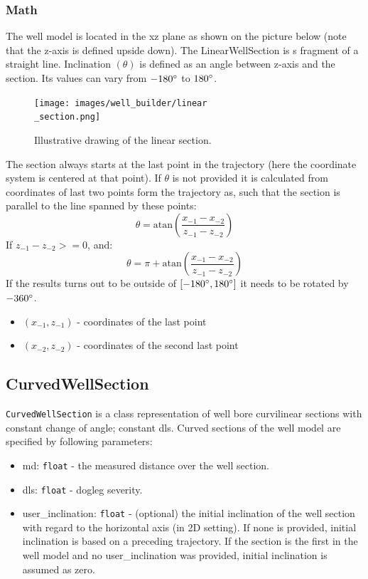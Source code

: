 	\subsubsection{Math}
	The well model is located in the xz plane as shown on the picture below (note that the z-axis is defined upside down). The LinearWellSection is s fragment of a straight line. Inclination $(\theta)$ is defined as an angle between z-axis and the section. Its values can vary from $-180\degree$ to $180\degree$.
	\begin{figure}[H]
		\centering
		\texttt{[image: images/well\_builder/linear\\\_section.png]}
		\caption{Illustrative drawing of the linear section.}
		\label{linear_section}
	\end{figure}
	The section always starts at the last point in the trajectory (here the coordinate system is centered at that point). If $\theta$ is not provided it is calculated from coordinates of last two points form the trajectory as, such that the section is parallel to the line spanned by these points:
	\begin{equation}
		\theta = \mathrm{atan}\left(\frac{x_{-1} - x_{-2}}{z_{-1} - z_{-2}}\right)
	\end{equation}
	If $z_{-1} - z_{-2} >= 0$, and:
	\begin{equation}
		\theta = \pi + \mathrm{atan}\left(\frac{x_{-1} - x_{-2}}{z_{-1} - z_{-2}}\right)
	\end{equation}
	If the results turns out to be outside of $[-180\degree, 180\degree]$ it needs to be rotated by $-360\degree$.
	\begin{itemize}
		\item $(x_{-1}, z_{-1})$ - coordinates of the last point
		\item $(x_{-2}, z_{-2})$ - coordinates of the second last point
	\end{itemize}
	\subsection{CurvedWellSection}
	\texttt{CurvedWellSection} is a class representation of well bore curvilinear sections with constant change of angle; constant dls. Curved sections of the well model are specified by following parameters:
	\begin{itemize}
		\item  \colorbox{gray!20}{md:} \texttt{float} - the measured distance over the well section.
		\item  \colorbox{gray!20}{dls:} \texttt{float} - dogleg severity.
		\item  \colorbox{gray!20}{user\_inclination:} \texttt{float} - (optional) the initial inclination of the well section with regard to the horizontal axis (in 2D setting). If none is provided, initial inclination is based on a preceding trajectory. If the section is the first in the well model and no user\_inclination was provided, initial inclination is assumed as zero.
	\end{itemize}
